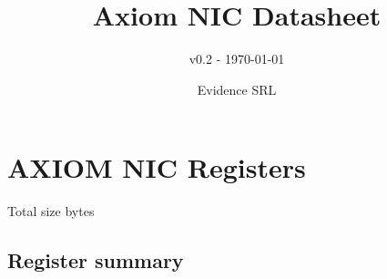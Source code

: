 \documentclass[10pt,a4paper]{paper}
\title{Axiom NIC Datasheet}
\subtitle{v0.2 - \today}
\author{Evidence SRL}
\begin{document}
\maketitle


\section{AXIOM NIC Registers}
\begin{regdescription}
	Total size       bytes\\
\end{regdescription}

\subsection{Register summary}
\end{document}
